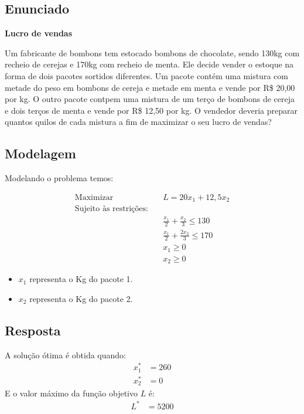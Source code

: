 \documentclass{article}
\begin{document}
\subsection{Enunciado}
\begin{mdframed}[backgroundcolor=yellow!10, linecolor=black, linewidth=2pt]
    \textbf{Lucro de vendas}
    
    Um fabricante de bombons tem estocado bombons de chocolate, sendo 130kg com recheio de cerejas e 170kg com recheio de menta. Ele decide vender o estoque na forma de dois pacotes sortidos diferentes. Um pacote contém uma mistura com metade do peso em bombons de cereja e metade em menta e vende por R\$ 20,00 por kg. O outro pacote contpem uma mistura de um terço de bombons de cereja e dois terços de menta e vende por R\$ 12,50 por kg. O vendedor deveria preparar quantos quilos de cada mistura a fim de maximizar o seu lucro de vendas?
\end{mdframed}

\subsection{Modelagem}
Modelando o problema temos:

\begin{align*}
    \text{Maximizar} \quad & L = 20x_1 + 12,5x_2 \\
    \text{Sujeito às restrições:} \quad & \\
    & \frac{x_1}{2} + \frac{x_2}{3} \leq 130 \\
    & \frac{x_1}{2} + \frac{2x_2}{3}\leq 170 \\
    & x_1 \geq 0 \\
    & x_2 \geq 0
\end{align*}


\begin{itemize}
    \item \(x_1\) representa o Kg do pacote 1.
    \item \(x_2\) representa o Kg do pacote 2.
\end{itemize}


\subsection{Resposta}

\begin{tcolorbox}[colback=blue!5!white, colframe=blue!75!black, title=Resultado]
A solução ótima é obtida quando:
\begin{align*}
    x_1^* &= 260 \\
    x_2^* &= 0
\end{align*}
E o valor máximo da função objetivo \(L\) é:
\begin{align*}
    L^* &= 5200
\end{align*}
\end{tcolorbox}
\end{document}
